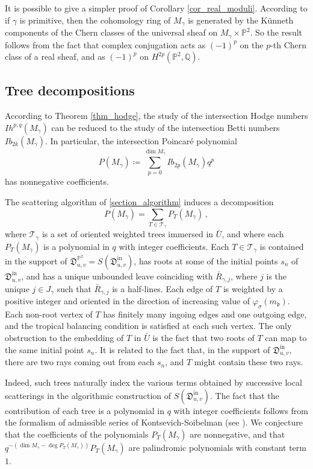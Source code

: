 \documentclass[12pt, a4paper]{amsart}
\newcommand\PP{\mathbb P}
\newcommand\Q{\mathbb Q}
\newcommand\fd{\mathfrak d}
\newcommand\fD{\mathfrak D}
\newcommand\iin{\mathrm{in}}
\begin{document}
It is possible to give a simpler proof of Corollary \ref{cor_real_moduli}.
According to \cite{MR1228610, MR1351502, MR2304330} if $\gamma$ is primitive, then the cohomology ring of $M_\gamma$ is generated by the Künneth components of the Chern classes of the universal sheaf on 
$M_\gamma \times \PP^2$. So the result follows from the fact that complex conjugation acts as $(-1)^p$ on the
$p$-th Chern class of a real sheaf, and as 
$(-1)^p$ on $H^{2p}(\PP^2,\Q)$.

\subsection{Tree decompositions}
\label{section_tree_decomposition}
According to Theorem \ref{thm_hodge}, the study of the intersection Hodge numbers 
$Ih^{p,q}(M_\gamma)$ can be reduced to the study of the intersection Betti numbers 
$Ib_{2k}(M_\gamma)$.
In particular, the intersection Poincar\'e polynomial 
\[ P(M_\gamma)\coloneq 
\sum_{p=0}^{\dim M_\gamma} Ib_{2p}(M_\gamma) q^p\]
has nonnegative coefficients.

The scattering algorithm of \cref{section_algorithm} induces a decomposition 
\[ P(M_\gamma)=\sum_{T \in \mathcal{T}_\gamma} P_T(M_\gamma)\,,\]
where $\mathcal{T}_\gamma$ is a set of oriented weighted trees immersed in $\bar{U}$, and where each 
$P_T(M_\gamma)$ is a polynomial in $q$ with integer coefficients.
Each $T \in \mathcal{T}_\gamma$ is contained in the support of $\fD^{\PP^2}_{u,v}=S(\fD^\iin_{u,v})$, has roots at some of the initial points $s_n$ of $\fD^\iin_{u,v}$, and has a unique unbounded leave coinciding with $\bar{R}_{\gamma,j}$, where $j$ is the unique $j \in J_\gamma$ such that $\bar{R}_{\gamma,j}$ is a half-lines. Each edge of $T$ is weighted by a positive integer and oriented in the direction of increasing value of 
$\varphi_\sigma(m_\fd)$. Each non-root vertex of $T$ has finitely many ingoing edges and one outgoing edge, and the tropical balancing condition is satisfied at each such vertex. The only obstruction to the embedding of $T$ in $\bar{U}$ is the fact that two roots of $T$ can map to the same initial point $s_n$. It is related to the fact that, in the support of $\fD^\iin_{u,v}$, there are two rays coming out from each $s_n$, and $T$ might contain these two rays.

Indeed, such trees naturally index the various terms obtained by successive local scatterings in the algorithmic construction of $S(\fD_{u,v}^\iin)$. The fact that the contribution of each tree is a polynomial in $q$ with integer coefficients follows from the formalism of admissible series of Kontsevich-Soibelman (see \cite[\S 6]{MR2851153}). We conjecture that the coefficients of the polynomials $P_T(M_\gamma)$ are nonnegative, and that  $q^{-(\dim M_\gamma -\deg P_T(M_\gamma))}P_T(M_\gamma)$ are palindromic polynomials with constant term $1$.
\end{document}
